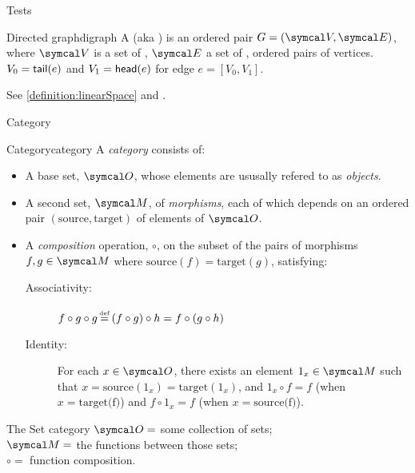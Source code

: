 \documentclass{PalisadesLakesArticle}
\begin{document}
\begin{plSection}{Tests}
\begin{plDefinition*}{Directed graph}{digraph}
A  (aka ) is
an ordered pair $G=\left( \Set{V}, \Set{E} \right)$,
where $\Set{V}$ is a set of , 
$\Set{E}$ a set of , ordered pairs of vertices.
$V_0 = \tail(e)$ and $V_1 = \head(e)$
for edge $e = \left[ V_0, V_1 \right]$.
\end{plDefinition*}

See \cref{definition:linearSpace} 
and .

\begin{plSection}{Category}

\begin{plDefinition}{Category}{category}
A \textsl{category} consists of: 
\begin{itemize}
\item A base set, $\Set{O}$, 
whose elements are ususally refered to as \textit{objects}.
\item A second set, $\Set{M}$, of \textit{morphisms}, 
each of which depends on an ordered pair 
$\left( \text{source} , \text{target} \right)$ of elements of 
$\Set{O}$. 
\item A \textsl{composition} operation, $\circ$, on 
the subset of the pairs of morphisms $f , g \in \Set{M}$
where $\text{source}(f) = \text{target}(g)$, satisfying:
\begin{description}
\item[Associativity:] $f \circ g \circ g \operatorname{\overset{\underset{\mathrm{def}}{}}{=}} 
\left( f \circ g \right) \circ h 
= f \circ \left( g \circ h \right)$
\item[Identity:] For each $x \in \Set{O}$, there exists an element
$1_x \in \Set{M}$ such that 
$x = \text{source}(1_x) = \text{target}(1_x)$, and 
$1_x \circ f = f$ (when $x = \text{target(f)}$) and
$f \circ 1_x = f$ (when $x = \text{source(f)}$).
\end{description}
\end{itemize}
\end{plDefinition}

 \begin{plExample}{The Set category}{}
 $\Set{O} = $ some collection of sets;\\
 $\Set{M} = $ the functions between those sets;\\
 $\circ = $ function composition.  
 \end{plExample}
 

\end{plSection}
\end{plSection}
\end{document}
